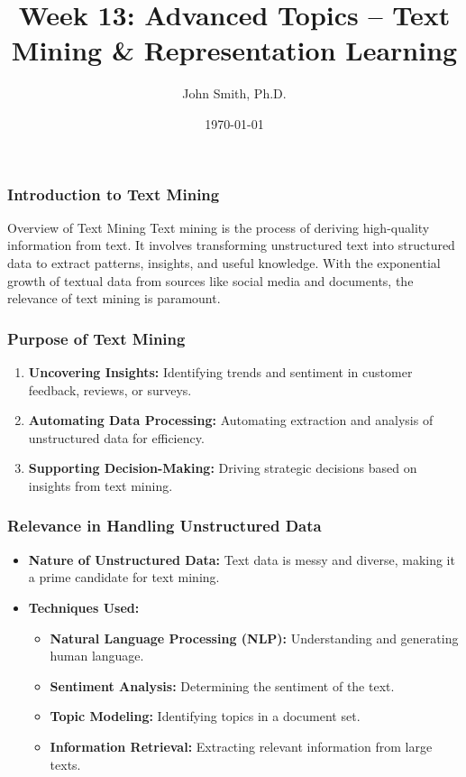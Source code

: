 \documentclass[aspectratio=169]{beamer}
\title[Week 13: Advanced Topics]{Week 13: Advanced Topics – Text Mining \& Representation Learning}
\author[J. Smith]{John Smith, Ph.D.}
\institute[University Name]{
  Department of Computer Science\\
  University Name\\
  \vspace{0.3cm}
  Email: email@university.edu\\
  Website: www.university.edu
}
\date{\today}
\begin{document}
\frame{\titlepage}

\begin{frame}[fragile]
    \frametitle{Introduction to Text Mining}
    \begin{block}{Overview of Text Mining}
        Text mining is the process of deriving high-quality information from text. It involves transforming unstructured text into structured data to extract patterns, insights, and useful knowledge. With the exponential growth of textual data from sources like social media and documents, the relevance of text mining is paramount.
    \end{block}
\end{frame}

\begin{frame}[fragile]
    \frametitle{Purpose of Text Mining}
    \begin{enumerate}
        \item \textbf{Uncovering Insights:} Identifying trends and sentiment in customer feedback, reviews, or surveys.
        \item \textbf{Automating Data Processing:} Automating extraction and analysis of unstructured data for efficiency.
        \item \textbf{Supporting Decision-Making:} Driving strategic decisions based on insights from text mining.
    \end{enumerate}
\end{frame}

\begin{frame}[fragile]
    \frametitle{Relevance in Handling Unstructured Data}
    \begin{itemize}
        \item \textbf{Nature of Unstructured Data:} Text data is messy and diverse, making it a prime candidate for text mining.
        \item \textbf{Techniques Used:}
        \begin{itemize}
            \item \textbf{Natural Language Processing (NLP):} Understanding and generating human language.
            \item \textbf{Sentiment Analysis:} Determining the sentiment of the text.
            \item \textbf{Topic Modeling:} Identifying topics in a document set.
            \item \textbf{Information Retrieval:} Extracting relevant information from large texts.
        \end{itemize}
    \end{itemize}
\end{frame}
\end{document}

